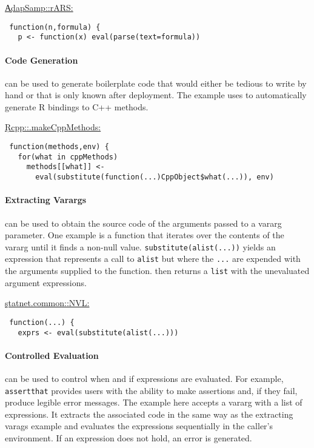 \documentclass[review,screen,acmsmall]{acmart}%
\renewcommand{\k}[1]{\lstinline |#1|\xspace}
\begin{document}
\begin{minipage}{.95\textwidth}
\medskip\underline{\c{AdapSamp::rARS}:}
\begin{lstlisting}
 function(n,formula) {
   p <- function(x) eval(parse(text=formula))
\end{lstlisting}\medskip
\end{minipage}

\paragraph{Code Generation}
\Eval can be used to generate boilerplate code that would either be tedious to
write by hand or that is only known after deployment. The example uses \eval to
automatically generate R bindings to C++ methods.

\begin{minipage}{.95\textwidth}
\medskip\underline{\c{Rcpp::.makeCppMethods}:}
\begin{lstlisting}
 function(methods,env) {
   for(what in cppMethods)
     methods[[what]] <-
       eval(substitute(function(...)CppObject$what(...)), env)
\end{lstlisting}\medskip
\end{minipage}

\paragraph{Extracting Varargs}
\Eval can be used to obtain the source code of the arguments passed to a vararg
parameter. One example is a function that iterates over the contents of the
vararg until it finds a non-null value. \k{substitute(alist(...))} yields an
expression that represents a call to \k{alist} but where the \k{...} are
expended with the arguments supplied to the function. \Eval then returns a
\k{list} with the unevaluated argument expressions.

\begin{minipage}{.95\textwidth}
\medskip\underline{\c{statnet.common::NVL}:}
\begin{lstlisting}
 function(...) {
   exprs <- eval(substitute(alist(...)))
\end{lstlisting}\medskip
\end{minipage}


\paragraph{Controlled Evaluation}
\Eval can be used to control when and if expressions are evaluated. For
example, \k{assertthat} provides users with the ability to make assertions and,
if they fail, produce legible error messages. The example here accepts a vararg
with a list of expressions. It extracts the associated code in the same way
as the extracting varags example and evaluates the expressions
sequentially in the caller's environment. If an expression does not hold, an
error is generated.
\end{document}
